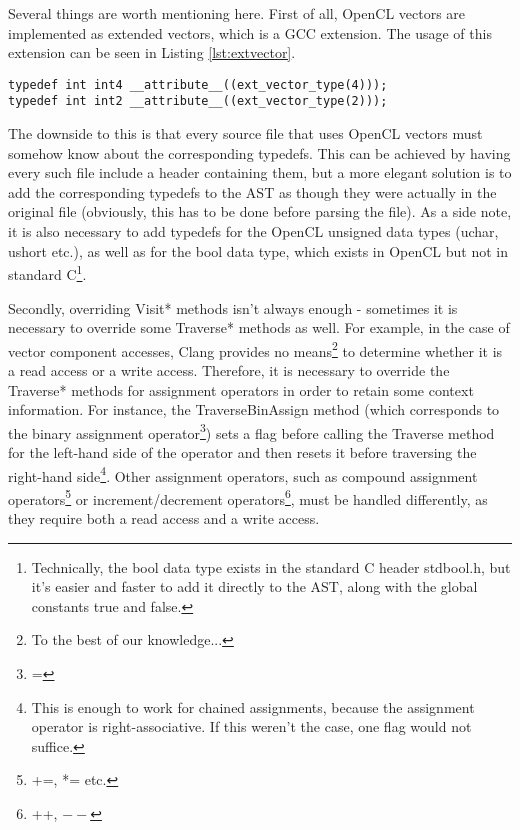 Several things are worth mentioning here. First of all, OpenCL vectors are implemented as extended vectors, which is a GCC extension. The usage of this extension can be seen in Listing \ref{lst:extvector}.

\begin{lstlisting}[label=lst:extvector, caption=GCC extended vector extension]
typedef int int4 __attribute__((ext_vector_type(4)));
typedef int int2 __attribute__((ext_vector_type(2)));
\end{lstlisting}

The downside to this is that every source file that uses OpenCL vectors must somehow know about the corresponding typedefs. This can be achieved by having every such file include a header containing them, but a more elegant solution is to add the corresponding typedefs to the AST as though they were actually in the original file (obviously, this has to be done before parsing the file). As a side note, it is also necessary to add typedefs for the OpenCL unsigned data types (uchar, ushort etc.), as well as for the bool data type, which exists in OpenCL but not in standard C\footnote{Technically, the bool data type exists in the standard C header stdbool.h, but it's easier and faster to add it directly to the AST, along with the global constants true and false.}.

Secondly, overriding Visit* methods isn't always enough - sometimes it is necessary to override some Traverse* methods as well. For example, in the case of vector component accesses, Clang provides no means\footnote{To the best of our knowledge...} to determine whether it is a read access or a write access. Therefore, it is necessary to override the Traverse* methods for assignment operators in order to retain some context information. For instance, the TraverseBinAssign method (which corresponds to the binary assignment operator\footnote{=}) sets a flag before calling the Traverse method for the left-hand side of the operator and then resets it before traversing the right-hand side\footnote{This is enough to work for chained assignments, because the assignment operator is right-associative. If this weren't the case, one flag would not suffice.}. Other assignment operators, such as compound assignment operators\footnote{+=, *= etc.} or increment/decrement operators\footnote{++, $--$}, must be handled differently, as they require both a read access and a write access.

